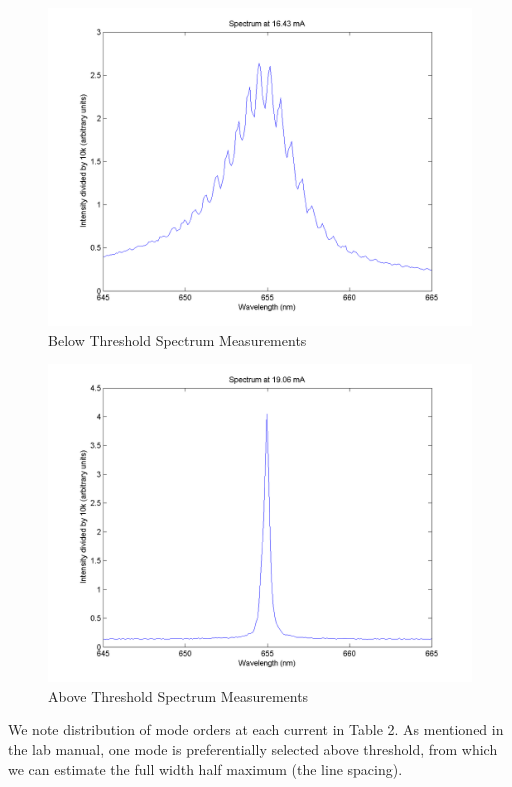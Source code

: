 \documentclass[10pt,a4paper]{article}
\begin{document}
\begin{figure}[H]
\centering
\includegraphics[scale = 0.4]{../Analysis/BelThresh2.png}
\caption{Below Threshold Spectrum Measurements} 
\end{figure} 
\begin{figure}[H]
\centering
\includegraphics[scale = 0.4]{../Analysis/AboThresh.png}
\caption{Above Threshold Spectrum Measurements} 
\end{figure} 
\noindent We note distribution of mode orders at each current in Table 2. As mentioned in the lab manual, one mode is preferentially selected above threshold, from which we can estimate the full width half maximum (the line spacing).
\end{document}

